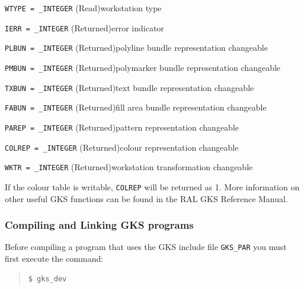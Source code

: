 \documentclass[twoside,11pt]{article}
\newcommand{\htmladdnormallink}[2]{#1}
\begin{document}
\begin{description}
\item {\tt WTYPE = \_INTEGER} (Read)\newline workstation type
\item {\tt IERR = \_INTEGER} (Returned)\newline error indicator
\item {\tt PLBUN = \_INTEGER} (Returned)\newline polyline bundle representation changeable
\item {\tt PMBUN = \_INTEGER} (Returned)\newline polymarker bundle representation changeable
\item {\tt TXBUN = \_INTEGER} (Returned)\newline text bundle representation changeable
\item {\tt FABUN = \_INTEGER} (Returned)\newline fill area bundle representation changeable
\item {\tt PAREP = \_INTEGER} (Returned)\newline pattern representation changeable
\item {\tt COLREP = \_INTEGER} (Returned)\newline colour representation changeable
\item {\tt WKTR = \_INTEGER} (Returned)\newline workstation transformation changeable
\end{description}

If the colour table is writable, {\tt COLREP} will be returned as 1. More information on other useful GKS functions can be found in the \htmladdnormallink{RAL GKS Reference Manual}{http://www.itd.clrc.ac.uk/Publications/RAL-GKS/gks_cat.html}.

\subsubsection{Compiling and Linking GKS programs}

Before compiling a program that uses the GKS include file {\tt GKS\_PAR} you must first execute the command: 

\small
\begin{quote}
\begin{verbatim}
$ gks_dev 
\end{verbatim}
\end{quote}
\normalsize
\end{document}
